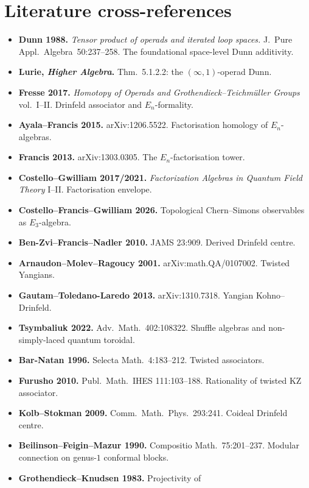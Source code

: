 \documentclass[11pt]{article}
\newcommand{\En}{E_{n}}
\begin{document}
\section{Literature cross-references}
\label{sec:literature}

\begin{itemize}[leftmargin=*]
\item \textbf{Dunn 1988.} \emph{Tensor product of operads and iterated
  loop spaces.} J.~Pure Appl.~Algebra~50:237--258. The foundational
  space-level Dunn additivity.
\item \textbf{Lurie, \emph{Higher Algebra}.} Thm.~5.1.2.2: the
  $(\infty, 1)$-operad Dunn.
\item \textbf{Fresse 2017.} \emph{Homotopy of Operads and
  Grothendieck--Teichm\"uller Groups} vol.~I--II. Drinfeld associator
  and $E_n$-formality.
\item \textbf{Ayala--Francis 2015.} arXiv:1206.5522. Factorisation
  homology of $\En$-algebras.
\item \textbf{Francis 2013.} arXiv:1303.0305. The $\En$-factorisation
  tower.
\item \textbf{Costello--Gwilliam 2017/2021.} \emph{Factorization
  Algebras in Quantum Field Theory} I--II. Factorisation envelope.
\item \textbf{Costello--Francis--Gwilliam 2026.} Topological
  Chern--Simons observables as $E_3$-algebra.
\item \textbf{Ben-Zvi--Francis--Nadler 2010.} JAMS 23:909. Derived
  Drinfeld centre.
\item \textbf{Arnaudon--Molev--Ragoucy 2001.} arXiv:math.QA/0107002.
  Twisted Yangians.
\item \textbf{Gautam--Toledano-Laredo 2013.} arXiv:1310.7318. Yangian
  Kohno--Drinfeld.
\item \textbf{Tsymbaliuk 2022.} Adv.~Math.~402:108322. Shuffle algebras
  and non-simply-laced quantum toroidal.
\item \textbf{Bar-Natan 1996.} Selecta Math.~4:183--212. Twisted
  associators.
\item \textbf{Furusho 2010.} Publ.~Math.~IHES 111:103--188.
  Rationality of twisted KZ associator.
\item \textbf{Kolb--Stokman 2009.} Comm.~Math.~Phys.~293:241. Coideal
  Drinfeld centre.
\item \textbf{Beilinson--Feigin--Mazur 1990.} Compositio
  Math.~75:201--237. Modular connection on genus-$1$ conformal blocks.
\item \textbf{Grothendieck--Knudsen 1983.} Projectivity of

\end{itemize}
\end{document}
